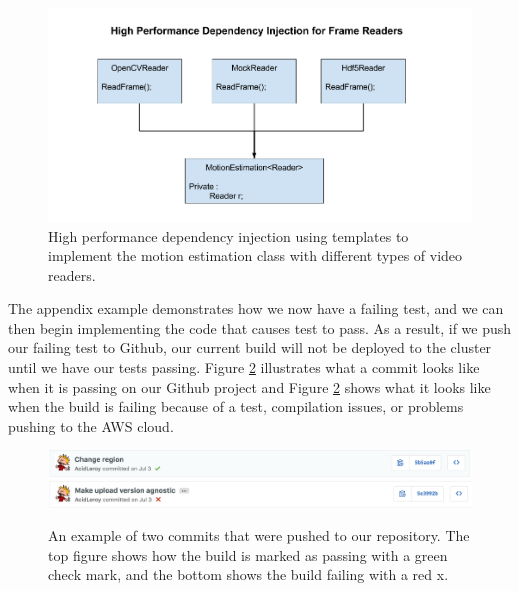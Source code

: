 \begin{figure}[h]

  \centering
  \includegraphics[width=\textwidth]{figures/dependency_injection}
  \caption{High performance dependency injection using templates to implement the
  motion estimation class with different types of video readers.}
  \label{fig:hiperf_dependency}
\end{figure}

The appendix example demonstrates how we now have a failing test, and we can then
begin implementing the code that causes test to pass. As a result, if we
push our failing test to Github, our current build will not be deployed to the cluster
until we have our tests passing. Figure \ref{fig:passing} illustrates what a commit
looks like when it is passing on our Github project and Figure \ref{fig:passing}
shows what it looks like when the build is failing because of a test, compilation
issues, or problems pushing to the AWS cloud.

\begin{figure}[h]

  \centering
  \includegraphics[width=\textwidth]{figures/passing}
  \includegraphics[width=\textwidth]{figures/failing}
  \caption{An example of two commits that were pushed to our repository. The
  top figure shows how the build is marked as passing with a green check mark,
  and the bottom shows the build failing with a red x.}
  \label{fig:passing}
\end{figure}


